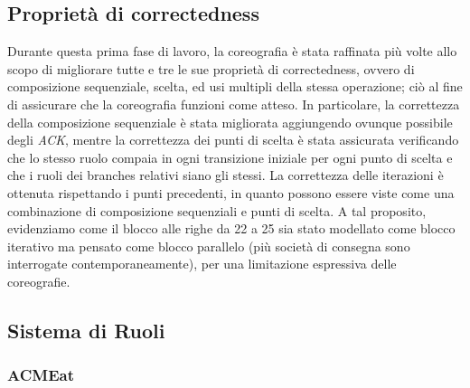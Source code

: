\documentclass[11pt]{article} %
\begin{document}
\subsection{Proprietà di correctedness}

Durante questa prima fase di lavoro, la coreografia è stata raffinata più volte allo scopo di migliorare tutte e tre le sue proprietà di correctedness, ovvero di composizione sequenziale, scelta, ed usi multipli della stessa operazione; ciò al fine di assicurare che la coreografia funzioni come atteso. In particolare, la correttezza della composizione sequenziale è stata migliorata aggiungendo ovunque possibile degli \emph{ACK}, mentre la correttezza dei punti di scelta è stata assicurata verificando che lo stesso ruolo compaia in ogni transizione iniziale per ogni punto di scelta e che i ruoli dei branches relativi siano gli stessi. La correttezza delle iterazioni è ottenuta rispettando i punti precedenti, in quanto possono essere viste come una combinazione di composizione sequenziali e punti di scelta. A tal proposito, evidenziamo come il blocco alle righe da 22 a 25 sia stato modellato come blocco iterativo ma pensato come blocco parallelo (più società di consegna sono interrogate contemporaneamente), per una limitazione espressiva delle coreografie.

\subsection{Sistema di Ruoli}
\label{sdr}

\subsubsection{ACMEat}
\end{document}
